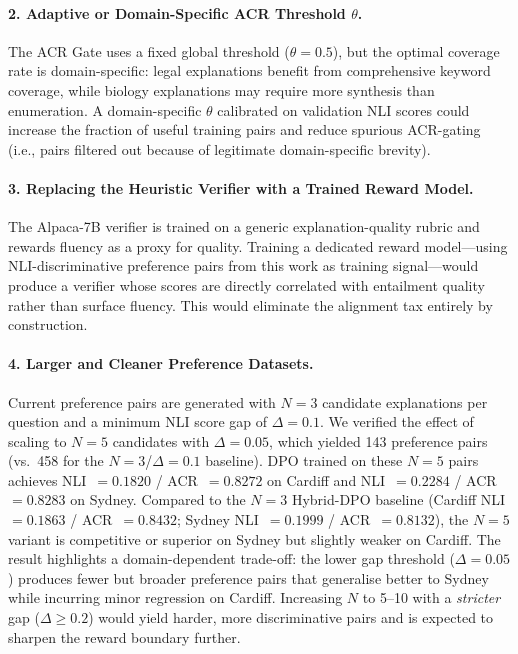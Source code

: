 \paragraph{2. Adaptive or Domain-Specific ACR Threshold $\theta$.}
The ACR Gate uses a fixed global threshold ($\theta=0.5$), but the optimal coverage rate is domain-specific: legal explanations benefit from comprehensive keyword coverage, while biology explanations may require more synthesis than enumeration.
A domain-specific $\theta$ calibrated on validation NLI scores could increase the fraction of useful training pairs and reduce spurious ACR-gating (i.e., pairs filtered out because of legitimate domain-specific brevity).

\paragraph{3. Replacing the Heuristic Verifier with a Trained Reward Model.}
The Alpaca-7B verifier is trained on a generic explanation-quality rubric and rewards fluency as a proxy for quality.
Training a dedicated reward model---using NLI-discriminative preference pairs from this work as training signal---would produce a verifier whose scores are directly correlated with entailment quality rather than surface fluency.
This would eliminate the alignment tax entirely by construction.

\paragraph{4. Larger and Cleaner Preference Datasets.}
Current preference pairs are generated with $N=3$ candidate explanations per question and a minimum NLI score gap of $\Delta=0.1$.
We verified the effect of scaling to $N=5$ candidates with $\Delta=0.05$, which yielded 143 preference pairs (vs.\ 458 for the $N=3$/$\Delta=0.1$ baseline).
DPO trained on these $N=5$ pairs achieves NLI~$=0.1820$ / ACR~$=0.8272$ on Cardiff and NLI~$=0.2284$ / ACR~$=0.8283$ on Sydney.
Compared to the $N=3$ Hybrid-DPO baseline (Cardiff NLI~$=0.1863$ / ACR~$=0.8432$; Sydney NLI~$=0.1999$ / ACR~$=0.8132$), the $N=5$ variant is competitive or superior on Sydney but slightly weaker on Cardiff.
The result highlights a domain-dependent trade-off: the lower gap threshold ($\Delta=0.05$) produces fewer but broader preference pairs that generalise better to Sydney while incurring minor regression on Cardiff.
Increasing $N$ to 5--10 with a \emph{stricter} gap ($\Delta\geq 0.2$) would yield harder, more discriminative pairs and is expected to sharpen the reward boundary further.

